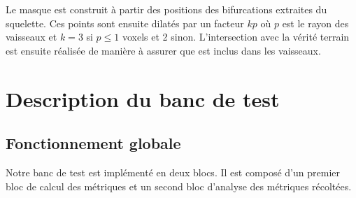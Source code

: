 Le masque \maskbif est construit à partir des positions des bifurcations extraites du squelette. Ces points sont ensuite dilatés par un facteur $kp$ où $p$ est le rayon des vaisseaux et $k=3$ si $p\leq 1$ voxels et 2 sinon. L'intersection avec la vérité terrain est ensuite réalisée de manière à assurer que \maskbif est inclus dans les vaisseaux.


\begin{table}
  \begin{center}
  \end{center}
  \caption{Itérations des expériences}
  \label{Tab:recap_versions}
\end{table}

\section{Description du banc de test}
\subsection{Fonctionnement globale}
Notre banc de test est implémenté en deux blocs. Il est composé d'un premier bloc de calcul des métriques et un second bloc d'analyse des métriques récoltées.

